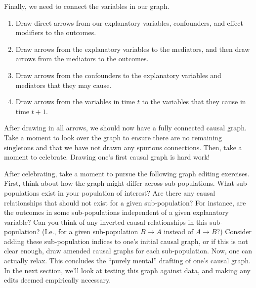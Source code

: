 Finally, we need to connect the variables in our graph.
\begin{enumerate}
   \item Draw direct arrows from our explanatory variables, confounders, and effect modifiers to the outcomes.
   \item Draw arrows from the explanatory variables to the mediators, and then draw arrows from the mediators to the outcomes.
   \item Draw arrows from the confounders to the explanatory variables and mediators that they may cause.
   \item Draw arrows from the variables in time $t$ to the variables that they cause in time $t+1$.
\end{enumerate}
After drawing in all arrows, we should now have a fully connected causal graph.
Take a moment to look over the graph to ensure there are no remaining singletons and that we have not drawn any spurious connections.
Then, take a moment to celebrate.
Drawing one's first causal graph is hard work!

After celebrating, take a moment to pursue the following graph editing exercises.
First, think about how the graph might differ across sub-populations.
What sub-populations exist in your population of interest?
Are there any causal relationships that should not exist for a given sub-population?
For instance, are the outcomes in some sub-populations independent of a given explanatory variable?
Can you think of any inverted causal relationships in this sub-population?
(I.e., for a given sub-population $B \rightarrow A$ instead of $A \rightarrow B$?)
Consider adding these sub-population indices to one's initial causal graph, or if this is not clear enough, draw amended causal graphs for each sub-population.
Now, one can actually relax.
This concludes the ``purely mental'' drafting of one's causal graph.
In the next section, we'll look at testing this graph against data, and making any edits deemed empirically necessary.
